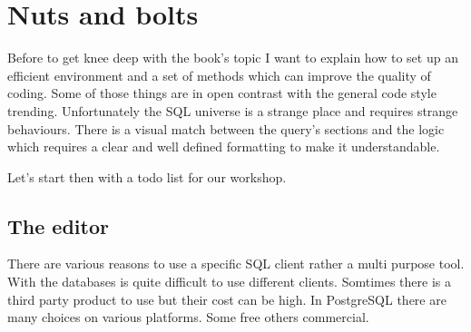 \chapter{Nuts and bolts}
Before to get knee deep with the book's topic I want to explain how to set up an 
efficient environment and a set of methods which can improve the quality of coding.
Some of those things are in open contrast with the general code style trending. 
Unfortunately the SQL universe is a strange place  and requires strange behaviours.
There is a visual match between the query's sections and the logic which requires a clear 
and well defined formatting to make it understandable.\newline

Let's start then with a todo list for our workshop. 

\section{The editor}
There are various reasons to use a specific SQL client rather a multi purpose tool. With 
the databases is quite difficult to use different clients. Somtimes there is a third party product 
to use but their cost can be high. In PostgreSQL there are many choices on various platforms. 
Some free others commercial. 